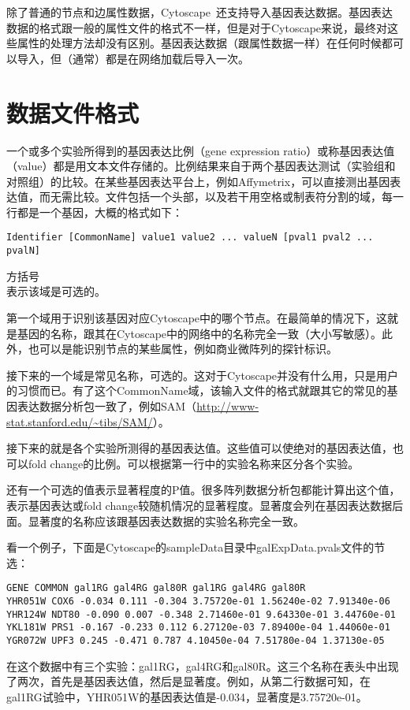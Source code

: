 除了普通的节点和边属性数据，Cytoscape~还支持导入基因表达数据。基因表达数据的格式跟一般的属性文件的格式不一样，但是对于Cytoscape来说，最终对这些属性的处理方法却没有区别。基因表达数据（跟属性数据一样）在任何时候都可以导入，但（通常）都是在网络加载后导入一次。 

\section{数据文件格式}
一个或多个实验所得到的基因表达比例（gene expression ratio）或称基因表达值（value）都是用文本文件存储的。比例结果来自于两个基因表达测试（实验组和对照组）的比较。在某些基因表达平台上，例如Affymetrix，可以直接测出基因表达值，而无需比较。文件包括一个头部，以及若干用空格或制表符分割的域，每一行都是一个基因，大概的格式如下：
\begin{verbatim}
Identifier [CommonName] value1 value2 ... valueN [pval1 pval2 ... pvalN]
\end{verbatim}
方括号\[ \]表示该域是可选的。

第一个域用于识别该基因对应Cytoscape中的哪个节点。在最简单的情况下，这就是基因的名称，跟其在Cytoscape中的网络中的名称完全一致（大小写敏感）。此外，也可以是能识别节点的某些属性，例如商业微阵列的探针标识。

接下来的一个域是常见名称，可选的。这对于Cytoscape并没有什么用，只是用户的习惯而已。有了这个CommonName域，该输入文件的格式就跟其它的常见的基因表达数据分析包一致了，例如SAM（\url{http://www-stat.stanford.edu/~tibs/SAM/}）。 

接下来的就是各个实验所测得的基因表达值。这些值可以使绝对的基因表达值，也可以fold change的比例。可以根据第一行中的实验名称来区分各个实验。

还有一个可选的值表示显著程度的P值。很多阵列数据分析包都能计算出这个值，表示基因表达或fold change较随机情况的显著程度。显著度会列在基因表达数据后面。显著度的名称应该跟基因表达数据的实验名称完全一致。

看一个例子，下面是Cytoscape的sampleData目录中galExpData.pvals文件的节选：
\begin{verbatim}
GENE COMMON gal1RG gal4RG gal80R gal1RG gal4RG gal80R
YHR051W COX6 -0.034 0.111 -0.304 3.75720e-01 1.56240e-02 7.91340e-06
YHR124W NDT80 -0.090 0.007 -0.348 2.71460e-01 9.64330e-01 3.44760e-01
YKL181W PRS1 -0.167 -0.233 0.112 6.27120e-03 7.89400e-04 1.44060e-01
YGR072W UPF3 0.245 -0.471 0.787 4.10450e-04 7.51780e-04 1.37130e-05
\end{verbatim}
在这个数据中有三个实验：gal1RG，gal4RG和gal80R。这三个名称在表头中出现了两次，首先是基因表达值，然后是显著度。例如，从第二行数据可知，在gal1RG试验中，YHR051W的基因表达值是-0.034，显著度是3.75720e-01。

